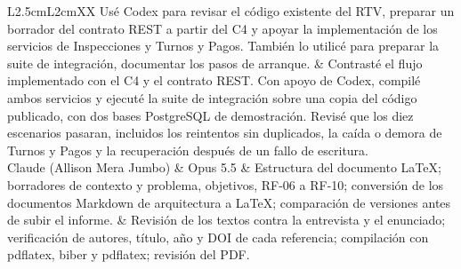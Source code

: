 \documentclass[11pt,a4paper]{article}
\begin{document}
\begin{xltabular}{\textwidth}{L{2.5cm}L{2cm}XX}
        Usé Codex para revisar el código existente del RTV, preparar un borrador del contrato REST a partir del C4 y apoyar la implementación de los servicios de Inspecciones y Turnos y Pagos. También lo utilicé para preparar la suite de integración, documentar los pasos de arranque. &
        Contrasté el flujo implementado con el C4 y el contrato REST. Con apoyo de Codex, compilé ambos servicios y ejecuté la suite de integración sobre una copia del código publicado, con dos bases PostgreSQL de demostración. Revisé que los diez escenarios pasaran, incluidos los reintentos sin duplicados, la caída o demora de Turnos y Pagos y la recuperación después de un fallo de escritura. \\
		Claude (Allison Mera Jumbo) & Opus 5.5 & Estructura del documento LaTeX; borradores de contexto y problema, objetivos, RF-06 a RF-10; conversión de los documentos Markdown de arquitectura a LaTeX; comparación de versiones antes de subir el informe. & Revisión de los textos contra la entrevista y el enunciado; verificación de autores, título, año y DOI de cada referencia; compilación con pdflatex, biber y pdflatex; revisión del PDF. \\
	\end{xltabular}
	
	\printbibliography[heading=bibintoc,title={Referencias}]
	
\end{document}

